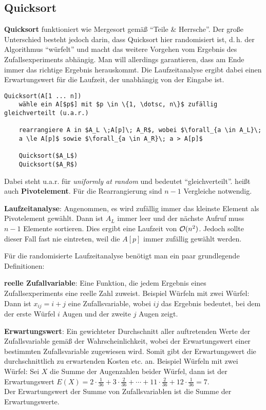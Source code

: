 \subsection{%
    Quicksort%
}

\textbf{Quicksort} funktioniert wie Mergesort gemäß "`Teile \& Herrsche"'.
Der große Unterschied besteht jedoch darin, dass Quicksort hier randomisiert
ist, d.\,h. der Algorithmus "`würfelt"' und macht das weitere Vorgehen
vom Ergebnis des Zufallsexperiments abhängig.
Man will allerdings garantieren, dass am Ende immer das richtige Ergebnis
herauskommt.
Die Laufzeitanalyse ergibt dabei einen Erwartungswert für die Laufzeit,
der unabhängig von der Eingabe ist.

\begin{lstlisting}
Quicksort(A[1 ... n])
    wähle ein A[$p$] mit $p \in \{1, \dotsc, n\}$ zufällig gleichverteilt (u.a.r.)
    
    rearrangiere A in $A_L \;A[p]\; A_R$, wobei $\forall_{a \in A_L}\;
    a \le A[p]$ sowie $\forall_{a \in A_R}\; a > A[p]$
    
    Quicksort($A_L$)
    Quicksort($A_R$)
\end{lstlisting}

Dabei steht u.a.r. für \emph{uniformly at random} und bedeutet
"`gleichverteilt"'.
 heißt auch \textbf{Pivotelement}.
Für die Rearrangierung sind $n - 1$ Vergleiche notwendig.

\linie

\textbf{Laufzeitanalyse}:
Angenommen, es wird zufällig immer das kleinste Element als Pivotelement
gewählt.
Dann ist $A_L$ immer leer und der nächste Aufruf muss $n - 1$ Elemente
sortieren.
Dies ergibt eine Laufzeit von $\mathcal{O}(n^2)$.
Jedoch sollte dieser Fall fast nie eintreten, weil die $A[p]$ immer zufällig
gewählt werden.

Für die randomisierte Laufzeitanalyse benötigt man ein paar grundlegende
Definitionen:

\textbf{reelle Zufallvariable}: Eine Funktion, die jedem Ergebnis eines
Zufallsexperiments eine reelle Zahl zuweist.
Beispiel Würfeln mit zwei Würfel:
Dann ist $x_{ij} = i + j$ eine Zufallsvariable, wobei $ij$ das Ergebnis
bedeutet, bei dem der erste Würfel $i$ Augen und der zweite $j$ Augen zeigt.

\textbf{Erwartungswert}: Ein gewichteter Durchschnitt aller auftretenden
Werte der Zufallsvariable gemäß der Wahrscheinlichkeit, wobei der
Erwartungswert einer bestimmten Zufallsvariable zugewiesen wird.
Somit gibt der Erwartungswert die durchschnittlich zu erwartenden Kosten
etc. an.
Beispiel Würfeln mit zwei Würfel:
Sei $X$ die Summe der Augenzahlen beider Würfel, dann ist
der Erwartungswert $E(X) = 2 \cdot \frac{1}{36} + 3 \cdot \frac{2}{36} +
\dotsb + 11 \cdot \frac{2}{36} + 12 \cdot \frac{1}{36} = 7$. \\
Der Erwartungswert der Summe von Zufallsvariablen ist die Summe
der Erwartungswerte.

